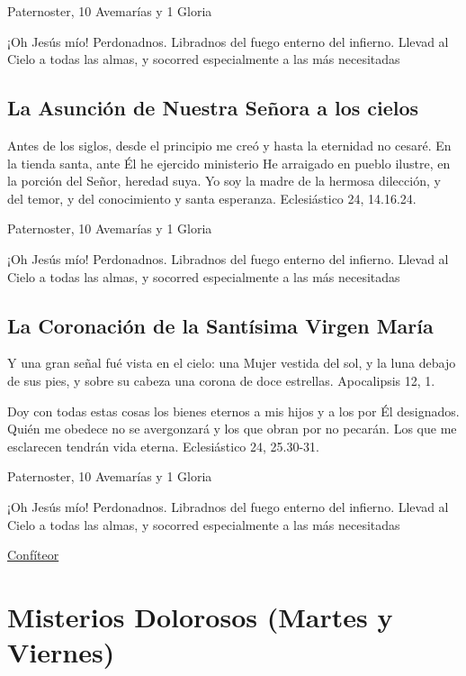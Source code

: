 \documentclass[a4paper,11pt, oneside]{report}
\begin{document}
{     Paternoster, 10 Avemarías y 1 Gloria
    
    \medskip
    ¡Oh Jesús mío! Perdonadnos. Libradnos del fuego enterno del infierno. Llevad al Cielo a todas las almas, y socorred especialmente a las más 
    necesitadas

  \subsection*{La Asunción de Nuestra Señora a los cielos}
    Antes de los siglos, desde el principio me creó y hasta la eternidad no cesaré. En la tienda santa, ante Él he ejercido ministerio
    He arraigado en pueblo ilustre, en la porción del Señor, heredad suya. Yo soy la madre de la hermosa dilección, y del temor, y del
    conocimiento y santa esperanza. Eclesiástico 24, 14.16.24.

     Paternoster, 10 Avemarías y 1 Gloria
    
    \medskip
    ¡Oh Jesús mío! Perdonadnos. Libradnos del fuego enterno del infierno. Llevad al Cielo a todas las almas, y socorred especialmente a las más 
    necesitadas

  \subsection*{La Coronación de la Santísima Virgen María}
    Y una gran señal fué vista en el cielo: una Mujer vestida del sol, y la luna debajo de sus pies, y sobre su cabeza una corona de doce estrellas.
    Apocalipsis 12, 1.

    \medskip
    Doy con todas estas cosas los bienes eternos a mis hijos y a los por Él designados. Quién me obedece no se avergonzará y los que obran por
    no pecarán. Los que me esclarecen tendrán vida eterna. Eclesiástico 24, 25.30-31.

     Paternoster, 10 Avemarías y 1 Gloria
    
    \medskip
    ¡Oh Jesús mío! Perdonadnos. Libradnos del fuego enterno del infierno. Llevad al Cielo a todas las almas, y socorred especialmente a las más 
    necesitadas

  \hyperlink{sec:confiteor}{Confíteor}
}
        
  \section*{ Misterios Dolorosos (Martes y Viernes)}
    
\end{document}
